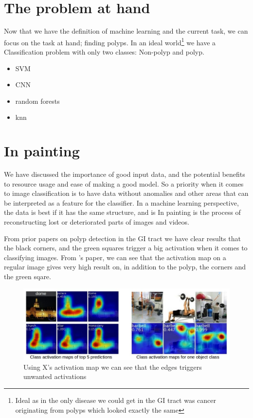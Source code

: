 	
	
	  
	  
\section{The problem at hand}
	  Now that we have the definition of machine learning and the current task, we can focus on the task at hand; finding polyps. In an ideal world\footnote{Ideal as in the only disease we could get in  the GI tract was cancer originating
	  from polyps which looked exactly the same} we have a
	  Classification problem with only two classes: Non-polyp and polyp. 
	  
	  \begin{itemize}
	    \item SVM 
	    \item CNN 
	    \item random forests
	    \item knn
	  \end{itemize}

\iffalse
\section{In painting}
  We have discussed the importance of good input data, and the potential benefits to resource usage and ease of making a good model.
  So a priority when it comes to image classification is to have data without anomalies and other areas that can be interpreted as a feature for the classifier. 
  In a machine learning perspective, the data is best if it has the same structure, and is %
  In painting is the process of reconstructing lost or deteriorated parts of images and videos. %
  

  From prior papers on polyp detection in the GI tract %
  we have clear results that the black corners, and the green squares trigger a big activation %
  when it comes to classifying images. 
  From %
  's paper, we can see that the activation map on a regular image gives very high result on, in addition to the polyp, the corners and the green sqare. 
  \begin{figure}[ht]
    \centering
    \includegraphics[scale=0.5]{background/figures/placeholder.jpeg}
    \caption{Using X's activation map we can see that the edges triggers unwanted activations}
  \end{figure}
  

